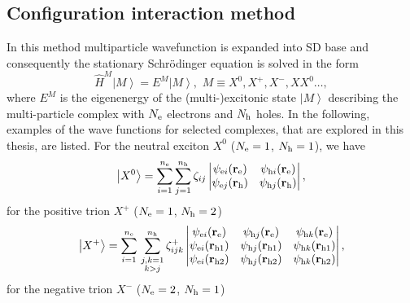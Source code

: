 \subsection{Configuration interaction method}\label{Sec:CI}
In this method multiparticle wavefunction is expanded into SD base and consequently the stationary Schrödinger equation is solved in the form
\begin{equation}
\label{eq:CISchroedinger}
\hat{H}^M\left|M\right>=E^M\left|M\right>,\,\,M\equiv X^0, X^+, X^-, XX^0\dots,
\end{equation}
%
where $E^M$ is the eigenenergy of the (multi-)excitonic state $\left|M\right>$ describing the multi-particle complex with $N_{\rm{e}}$ electrons and $N_{\rm{h}}$ holes. In the following, examples of the wave functions for selected complexes, that are explored in this thesis, are listed. For the neutral exciton $X^0$ ($N_{\rm{e}}=1$, $N_{\rm{h}}=1$), we have
%
\begin{equation}
\label{eq:suppl:CIWavefunctionX}
\left|X^0\right>=\sum^{n_{\rm{e}}}_{i=1}\sum^{n_{\rm{h}}}_{j=1}\zeta_{ij}
\begin{vmatrix}
\psi_{{\rm{e}}i}(\mathbf{r}_{\rm{e}})&\psi_{{\rm{h}}i}(\mathbf{r}_{\rm{e}})\\
\psi_{{\rm{e}}j}(\mathbf{r}_{\rm{h}})&\psi_{{\rm{h}}j}(\mathbf{r}_{\rm{h}})\\
\end{vmatrix},
\end{equation}
%
for the positive trion $X^+$ ($N_{\rm{e}}=1$, $N_{\rm{h}}=2$)
%
\begin{equation}
\label{eq:suppl:CIWavefunctionX+}
\left|X^+\right>=
\sum^{n_{\rm{e}}}_{i=1}\,\sum^{n_{\rm{h}}}_{\substack{j,k=1\\k>j}}\zeta^+_{ijk}
\begin{vmatrix}
\psi_{{\rm{e}}i}(\mathbf{r}_{\rm{e}})&\psi_{{\rm{h}}j}(\mathbf{r}_{{\rm{e}}})&\psi_{{\rm{h}}k}(\mathbf{r}_{{\rm{e}}})\\
\psi_{{\rm{e}}i}(\mathbf{r}_{{\rm{h}}1})&\psi_{{\rm{h}}j}(\mathbf{r}_{{\rm{h}}1})&\psi_{{\rm{h}}k}(\mathbf{r}_{{\rm{h}}1})\\
\psi_{{\rm{e}}i}(\mathbf{r}_{{\rm{h}}2})&\psi_{{\rm{h}}j}(\mathbf{r}_{{\rm{h}}2})&\psi_{{\rm{h}}k}(\mathbf{r}_{{\rm{h}}2})\\
\end{vmatrix},
\end{equation}
%
for the negative trion $X^-$ ($N_{\rm{e}}=2$, $N_{\rm{h}}=1$)
%
